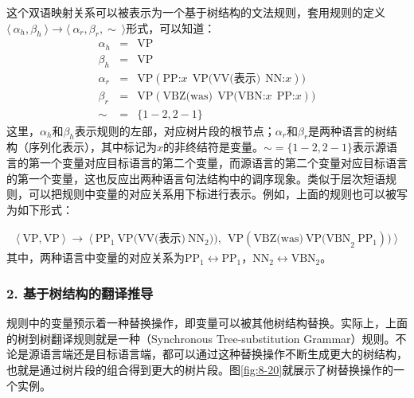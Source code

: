 \parinterval 这个双语映射关系可以被表示为一个基于树结构的文法规则，套用规则的定义$\langle\  \alpha_h, \beta_h\ \rangle \to \langle\ \alpha_r, \beta_r, \sim\ \rangle$形式，可以知道：
\begin{eqnarray}
\alpha_h &=& \textrm{VP} \nonumber \\
\beta_h &=& \textrm{VP} \nonumber \\
\alpha_r &=& \textrm{VP}(\textrm{PP:}x\ \ \textrm{VP(VV(表示)}\ \ \textrm{NN:}x)) \nonumber \\
\beta_r &=& \textrm{VP}(\textrm{VBZ(was)}\ \ \textrm{VP(VBN:}x\ \ \textrm{PP:}x)) \nonumber \\
\sim &=& \{1-2,2-1\} \nonumber
\end{eqnarray}
\noindent 这里，$\alpha_h$和$\beta_h$表示规则的左部，对应树片段的根节点；$\alpha_r$和$\beta_r$是两种语言的树结构（序列化表示），其中标记为$x$的非终结符是变量。$\sim = \{1-2,2-1\}$表示源语言的第一个变量对应目标语言的第二个变量，而源语言的第二个变量对应目标语言的第一个变量，这也反应出两种语言句法结构中的调序现象。类似于层次短语规则，可以把规则中变量的对应关系用下标进行表示。例如，上面的规则也可以被写为如下形式：

\begin{eqnarray}
\langle\ \textrm{VP}, \textrm{VP}\ \rangle\ \to\ \langle\ \textrm{PP}_{1} \ \textrm{VP(VV(表示)}\ \textrm{NN}_{2})),\ \ \textrm{VP}(\textrm{VBZ(was)}\ \textrm{VP(VBN}_{2} \ \textrm{PP}_{1})) \ \rangle \nonumber
\end{eqnarray}
\noindent 其中，两种语言中变量的对应关系为$\textrm{PP}_1 \leftrightarrow \textrm{PP}_1$，$\textrm{NN}_2 \leftrightarrow \textrm{VBN}_2$。


\subsubsection{2. 基于树结构的翻译推导}

\parinterval 规则中的变量预示着一种替换操作，即变量可以被其他树结构替换。实际上，上面的树到树翻译规则就是一种{\small{}}（Synchronous Tree-substitution Grammar）规则。不论是源语言端还是目标语言端，都可以通过这种替换操作不断生成更大的树结构，也就是通过树片段的组合得到更大的树片段。图\ref{fig:8-20}就展示了树替换操作的一个实例。

